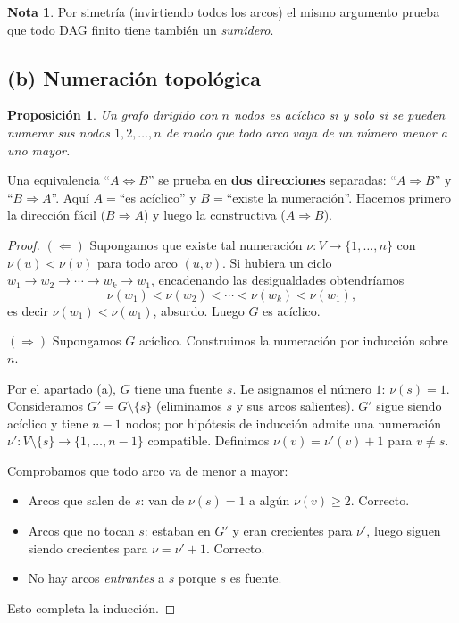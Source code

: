 \documentclass[11pt,a4paper]{article}
\theoremstyle{plain}
\newtheorem{proposicion}{Proposici\'on}
\theoremstyle{definition}
\newtheorem*{nota}{Nota}
\begin{document}
\begin{nota}
Por simetr\'ia (invirtiendo todos los arcos) el mismo argumento prueba que todo DAG
finito tiene tambi\'en un \emph{sumidero}.
\end{nota}

\subsection*{(b) Numeraci\'on topol\'ogica}

\begin{proposicion}
Un grafo dirigido con $n$ nodos es ac\'iclico si y solo si se pueden numerar sus nodos
$1,2,\dots,n$ de modo que todo arco vaya de un n\'umero menor a uno mayor.
\end{proposicion}

\begin{concepto}
Una equivalencia ``$A\Leftrightarrow B$'' se prueba en \textbf{dos direcciones}
separadas: ``$A\Rightarrow B$'' y ``$B\Rightarrow A$''. Aqu\'i $A=$``es ac\'iclico'' y
$B=$``existe la numeraci\'on''. Hacemos primero la direcci\'on f\'acil
($B\Rightarrow A$) y luego la constructiva ($A\Rightarrow B$).
\end{concepto}

\begin{proof}
$(\Leftarrow)$ Supongamos que existe tal numeraci\'on $\nu:V\to\{1,\dots,n\}$ con
$\nu(u)<\nu(v)$ para todo arco $(u,v)$. Si hubiera un ciclo
$w_1\to w_2\to\cdots\to w_k\to w_1$, encadenando las desigualdades obtendr\'iamos
\[
\nu(w_1)<\nu(w_2)<\cdots<\nu(w_k)<\nu(w_1),
\]
es decir $\nu(w_1)<\nu(w_1)$, absurdo. Luego $G$ es ac\'iclico.

$(\Rightarrow)$ Supongamos $G$ ac\'iclico. Construimos la numeraci\'on por inducci\'on
sobre $n$.

Por el apartado (a), $G$ tiene una fuente $s$. Le asignamos el n\'umero $1$:
$\nu(s)=1$. Consideramos $G'=G\setminus\{s\}$ (eliminamos $s$ y sus arcos
salientes). $G'$ sigue siendo ac\'iclico y tiene $n-1$ nodos; por hip\'otesis de
inducci\'on admite una numeraci\'on $\nu':V\setminus\{s\}\to\{1,\dots,n-1\}$
compatible. Definimos $\nu(v)=\nu'(v)+1$ para $v\neq s$.

Comprobamos que todo arco va de menor a mayor:
\begin{itemize}[nosep]
  \item Arcos que salen de $s$: van de $\nu(s)=1$ a alg\'un $\nu(v)\geq 2$. Correcto.
  \item Arcos que no tocan $s$: estaban en $G'$ y eran crecientes para $\nu'$, luego
        siguen siendo crecientes para $\nu=\nu'+1$. Correcto.
  \item No hay arcos \emph{entrantes} a $s$ porque $s$ es fuente.
\end{itemize}
Esto completa la inducci\'on.
\end{proof}
\end{document}
